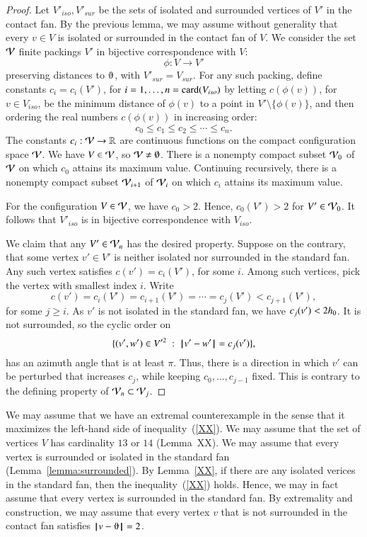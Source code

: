 \begin{proof}  
Let $V'_{iso},V'_{sur}$ be the
sets of isolated and surrounded vertices of $V'$ in the contact
fan.
By the previous lemma, we may assume
without generality that every $v\in V$ is isolated
or surrounded in the contact fan of $V$.    
We consider the set ${\mathcal V}$ finite
packings $V'$ in bijective correspondence with $V$:
$$
\phi:V\to V'
$$
preserving distances to $\orgn$, with $V'_{sur}=V_{sur}$.
For any such packing, define constants $c_i=c_i(V')$,
for $i=1,\ldots,n={\operatorname{card}}(V_{iso})$ by letting 
$c(\phi(v))$, for $v\in V_{iso}$, 
be the minimum distance of $\phi(v)$ to a point
in $V'\setminus \{\phi(v)\}$, and then ordering the real numbers $c(\phi(v))$ in increasing order:
$$
c_0 \le c_1 \le c_2 \le \cdots \le c_n.
$$
The constants $c_i:{\mathcal V}\to\mathbb{R}$ are continuous functions on the compact configuration space ${\mathcal V}$.
We have $V\in {\mathcal V}$, so ${\mathcal V}\ne\emptyset$.
There is a nonempty 
compact subset ${\mathcal V}_0$ of ${\mathcal V}$ on which
$c_0$ attains its maximum value. Continuing recursively,
there is a nonempty compact subset ${\mathcal V}_{i+1}$ of
${\mathcal V}_{i}$ on which $c_i$ attains its maximum value.

For the configuration $V\in {\mathcal V}$, we have $c_0 >2$.
Hence, $c_0(V')>2$ for $V'\in{\mathcal V}_0$.  It follows
that $V'_{iso}$ is in bijective correspondence with
$V_{iso}$.

We claim that any $V'\in {\mathcal V}_n$ has the desired property.
Suppose on the contrary, that some vertex $v'\in V'$
is neither isolated nor surrounded in the standard fan.  
Any such vertex satisfies $c(v')=c_i(V')$, for some $i$.
Among such vertices, pick the vertex with smallest index
$i$.  Write 
$$
c(v') = c_i(V') = c_{i+1}(V') =\cdots= c_j(V') < c_{j+1}(V'),
$$
for some $j\ge i$.  As $v'$ is not isolated in the
standard fan, we have $c_j(v') < 2{h_0}$.  It is not surrounded,
so the cyclic order on
$$
\{(v',w')\in V'^2 \ :\  {\hskip0.1em|\hskip-0.15em|\hskip0.1em}v' - w'{\hskip0.1em|\hskip-0.15em|\hskip0.1em} = c_j(v')\},
$$
has an azimuth angle that is at least $\pi$.
Thus, there is a direction in which $v'$ can be perturbed
that increases $c_j$, while keeping $c_0,\ldots,c_{j-1}$
fixed.  This is contrary to the defining property of
${\mathcal V}_n\subset{\mathcal V}_j$.
\end{proof}


We may assume that we have an extremal counterexample
in the sense that it maximizes the left-hand side of inequality~(\ref{XX}).  We may assume that the set of vertices $V$ has cardinality $13$ or $14$ (Lemma~{XX}).
We may assume that every vertex is surrounded or isolated in
the standard fan (Lemma~\ref{lemma:surrounded}).  By Lemma~\ref{XX}, if there are any isolated verices in the standard fan, then the inequality~(\ref{XX}) holds.  Hence, we may in fact assume that every vertex is surrounded in the standard fan.
By extremality and construction, we may assume that every vertex $v$ that is not surrounded in the contact fan satisfies $\norm{v}{\orgn}=2$.



